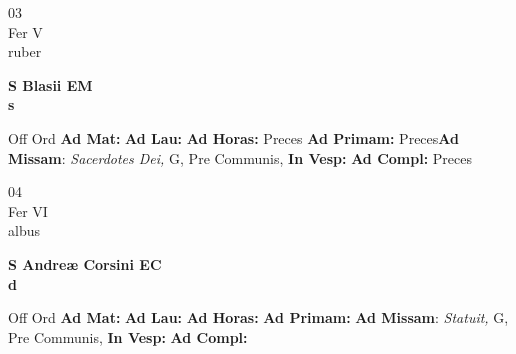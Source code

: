 \documentclass[10pt, openany]{book}
\begin{document}
        \begin{center}
            \begin{minipage}{3.5in}
                \vspace{2em}
                \begin{minipage}{0.5in}
                    {\Huge 03} \\
                    {\normalsize Fer V} \\
                    {\normalsize ruber}
                \end{minipage}
                \begin{minipage}{3.0in}
                    \textbf{ \large S Blasii EM \\
                    \textnormal{\normalsize s}} \\ 
                \end{minipage}
                \begin{justify}Off Ord
                    \textbf{Ad Mat: }
                    \textbf{Ad Lau: }
                    \textbf{Ad Horas: }Preces
                    \textbf{Ad Primam: }Preces\textbf{Ad Missam}: \textit{Sacerdotes Dei,} G, Pre Communis,  
                    \textbf{In Vesp: }
                    \textbf{Ad Compl: }Preces
                \end{justify}
            \end{minipage}
        \end{center}
    
        \begin{center}
            \begin{minipage}{3.5in}
                \vspace{2em}
                \begin{minipage}{0.5in}
                    {\Huge 04} \\
                    {\normalsize Fer VI} \\
                    {\normalsize albus}
                \end{minipage}
                \begin{minipage}{3.0in}
                    \textbf{ \large S Andreæ Corsini EC \\
                    \textnormal{\normalsize d}} \\ 
                \end{minipage}
                \begin{justify}Off Ord
                    \textbf{Ad Mat: }
                    \textbf{Ad Lau: }
                    \textbf{Ad Horas: }
                    \textbf{Ad Primam: }\textbf{Ad Missam}: \textit{Statuit,} G, Pre Communis,  
                    \textbf{In Vesp: }
                    \textbf{Ad Compl: }
                \end{justify}
            \end{minipage}
        \end{center}
    
\end{document}
